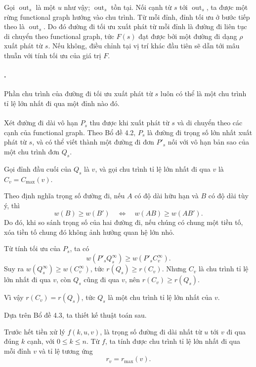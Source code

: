 \documentclass[11pt]{article}
\begin{document}
Gọi \(\operatorname{out}_s\) là một \(u\) như vậy; \(\operatorname{out}_s\)
tồn tại. Nối cạnh từ \(s\) tới \(\operatorname{out}_s\), ta được một rừng
functional graph hướng vào chu trình. Từ mỗi đỉnh, đỉnh tối ưu ở bước tiếp
theo là \(\operatorname{out}_s\). Do đó đường đi tối ưu xuất phát từ mỗi đỉnh
là đường đi liên tục di chuyển theo functional graph, tức \(F(s)\) đạt được
bởi một đường đi dạng \(\rho\) xuất phát từ \(s\). Nếu không, điều chỉnh tại vị
trí khác đầu tiên sẽ dẫn tới mâu thuẫn với tính tối ưu của giá trị \(F\).

\paragraph{.}
Phần chu trình của đường đi tối ưu xuất phát từ \(s\) luôn có thể là một chu
trình tỉ lệ lớn nhất đi qua một đỉnh nào đó.

\paragraph{}
Xét đường đi dài vô hạn \(P_s\) thu được khi xuất phát từ \(s\) và di chuyển
theo các cạnh của functional graph. Theo Bổ đề 4.2, \(P_s\) là đường đi trọng
số lớn nhất xuất phát từ \(s\), và có thể viết thành một đường đi đơn \(P'_s\)
nối với vô hạn bản sao của một chu trình đơn \(Q_s\).

Gọi đỉnh đầu cuối của \(Q_s\) là \(v\), và gọi chu trình tỉ lệ lớn nhất đi qua
\(v\) là \(C_v=C_{\max}(v)\).

Theo định nghĩa trọng số đường đi, nếu \(A\) có độ dài hữu hạn và \(B\) có độ
dài tùy ý, thì
\[
  w(B)\ge w(B')
  \quad\Longleftrightarrow\quad
  w(AB)\ge w(AB').
\]
Do đó, khi so sánh trọng số của hai đường đi, nếu chúng có chung một tiền tố,
xóa tiền tố chung đó không ảnh hưởng quan hệ lớn nhỏ.

Từ tính tối ưu của \(P_s\), ta có
\[
  w(P'_sQ_s^\infty)\ge w(P'_sC_v^\infty).
\]
Suy ra \(w(Q_s^\infty)\ge w(C_v^\infty)\), tức \(r(Q_s)\ge r(C_v)\). Nhưng
\(C_v\) là chu trình tỉ lệ lớn nhất đi qua \(v\), còn \(Q_s\) cũng đi qua
\(v\), nên \(r(C_v)\ge r(Q_s)\).

Vì vậy \(r(C_v)=r(Q_s)\), tức \(Q_s\) là một chu trình tỉ lệ lớn nhất của
\(v\).

Dựa trên Bổ đề 4.3, ta thiết kế thuật toán sau.

Trước hết tiền xử lý \(f(k,u,v)\), là trọng số đường đi dài nhất từ \(u\) tới
\(v\) đi qua đúng \(k\) cạnh, với \(0\le k\le n\). Từ \(f\), ta tính được chu
trình tỉ lệ lớn nhất đi qua mỗi đỉnh \(v\) và tỉ lệ tương ứng
\[
  r_v=r_{\max}(v).
\]
\end{document}

